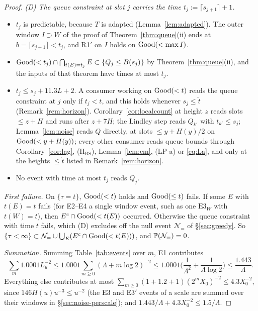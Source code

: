 \begin{proof}
\emph{(D) The queue constraint at slot $j$ carries the time $t_j:=\lceil s_{j+1}\rceil+1$.}
\begin{itemize}
\item $t_j$ is predictable, because $T$ is adapted (Lemma~\ref{lem:adapted}). The outer window $I\supset W$ of the proof of
  Theorem~\ref{thm:queue}(ii) ends at $b=\lceil s_{j+1}\rceil<t_j$, and R1$'$ on $I$ holds on $\mathrm{Good}(<\max I)$.
\item $\mathrm{Good}(<t_j)\cap\bigcap_{t(E)=t_j}E\subset\{Q_j\le B(s_j)\}$ by Theorem~\ref{thm:queue}(ii), and the inputs of that
  theorem have times at most $t_j$.
\item $t_j\le s_j+11.3L+2$. A consumer working on $\mathrm{Good}(<t)$ reads the queue constraint at $j$ only if $t_j<t$, and this holds
  whenever $s_j\le\check t$ (Remark~\ref{rem:horizon}). Corollary~\ref{cor:localcount} at height $z$ reads slots $\le z+H$ and runs
  after $z+7H$; the Lindley step reads $Q_{k'}$ with $t_{k'}\le s_j$; Lemma~\ref{lem:noise} reads $Q$ directly, at slots
  $\le y+H(y)/2$ on $\mathrm{Good}(<y+H(y))$; every other consumer reads queue bounds through
  Corollary~\ref{cor:lag}, \textup{(H$_{\mathrm{BS}}$)}, Lemma~\ref{lem:cm}, (LP-a) or \eqref{eq:La}, and only at the heights
  $\le\check t$ listed in Remark~\ref{rem:horizon}.
\item No event with time at most $t_j$ reads $Q_j$.
\end{itemize}

\emph{First failure.} On $\{\tau=t\}$, $\mathrm{Good}(<t)$ holds and $\mathrm{Good}(\le t)$ fails. If some $E$ with $t(E)=t$ fails (for E2--E4 a
single window event, such as one $\mathrm{E3}_W$ with $t(W)=t$), then $E^c\cap\mathrm{Good}(<t(E))$ occurred. Otherwise the queue constraint with time $t$ fails, which (D) excludes off the null event $\mathcal N_{=}$ of \S\ref{sec:greedy}. So
$\{\tau<\infty\}\subset \mathcal N_{=}\cup\bigcup_E(E^c\cap\mathrm{Good}(<t(E)))$, and $\mathbb{P}(\mathcal N_{=})=0$.

\emph{Summation.} Summing Table~\ref{tab:events} over $m$, E1 contributes
\[
\sum_m1.0001L_u^{-2}\le1.0001\sum_{m\ge0}(\Lambda+m\log2)^{-2}\le1.0001\Big(\frac1{\Lambda^2}+\frac1{\Lambda\log2}\Big)\le\frac{1.443}\Lambda.
\]
Everything else contributes at most $\sum_{m\ge0}(1+1.2+1)(2^mX_0)^{-2}\le4.3X_0^{-2}$, since $146H(u)u^{-3}\le u^{-2}$ (the
E3 and E3$'$ events of a scale are summed over their windows in \S\ref{sec:noise-perscale}); and
$1.443/\Lambda+4.3X_0^{-2}\le1.5/\Lambda$.


\end{proof}
